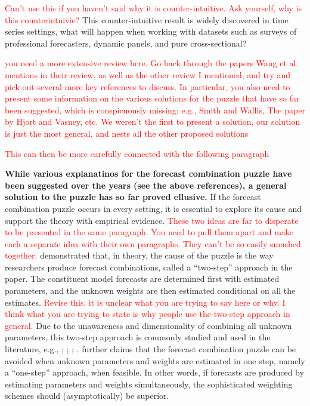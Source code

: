 \documentclass{monashthesis}
\begin{document}
\textcolor{red}{Can't use this if you haven't said why it is counter-intuitive. Ask yourself, why is this counterintuivie? }
This counter-intuitive result is widely discovered in time series settings, what will happen when working with datasets such as surveys of professional forecasters, dynamic panels, and pure cross-sectional?

\textcolor{red}{you need a more extensive review here. Go back through the papers Wang et al. mentions in their review, as well as the other review I mentioned, and try and pick out several more key references to discuss. In particular, you also need to present some information on the various solutions for the puzzle that have so far been suggested, which is conspicuously missing; e.g., Smith and Wallis, The paper by Hjort and Vasney, etc. We weren't the first to present a solution, our solution is just the most general, and nests all the other proposed solutions}

\textcolor{red}{This can then be more carefully connected with the following paragraph}

\textbf{While various explanatinos for the forecast combination puzzle have been suggested over the years (see the above references), a general solution to the puzzle has so far proved ellusive.} If the forecast combination puzzle occurs in every setting, it is essential to explore its cause and support the theory with empirical evidence.
\textcolor{red}{These two ideas are far to disperate to be presented in the same paragraph. You need to pull them apart and make each a separate idea with their own paragraphs. They can't be so easily smushed together.}
\textcite{FZMP23} demonstrated that, in theory, the cause of the puzzle is the way researchers produce forecast combinations, called a ``two-step'' approach in the paper. The constituent model forecasts are determined first with estimated parameters, and the unknown weights are then estimated conditional on all the estimates. \textcolor{red}{Revise this, it is unclear what you are trying to say here or why. I think what you are trying to state is why people use the two-step approach in general. } Due to the unawareness and dimensionality of combining all unknown parameters, this two-step approach is commonly studied and used in the literature, e.g., \textcite{HM07}; \textcite{GA11}; \textcite{GR13}; \textcite{BS16}. \textcite{FZMP23} further claims that the forecast combination puzzle can be avoided when unknown parameters and weights are estimated in one step, namely a ``one-step'' approach, when feasible. In other words, if forecasts are produced by estimating parameters and weights simultaneously, the sophisticated weighting schemes should (asymptotically) be superior.
\end{document}
